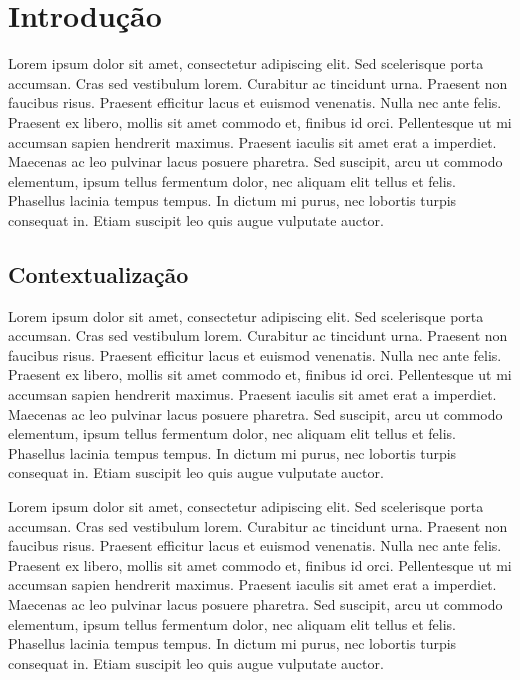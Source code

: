 \chapter{Introdução}
\label{1-introducao}

Lorem ipsum dolor sit amet, consectetur adipiscing elit. Sed scelerisque porta accumsan. Cras sed vestibulum lorem. Curabitur ac tincidunt urna. Praesent non faucibus risus. Praesent efficitur lacus et euismod venenatis. Nulla nec ante felis. Praesent ex libero, mollis sit amet commodo et, finibus id orci. Pellentesque ut mi accumsan sapien hendrerit maximus. Praesent iaculis sit amet erat a imperdiet. Maecenas ac leo pulvinar lacus posuere pharetra. Sed suscipit, arcu ut commodo elementum, ipsum tellus fermentum dolor, nec aliquam elit tellus et felis. Phasellus lacinia tempus tempus. In dictum mi purus, nec lobortis turpis consequat in. Etiam suscipit leo quis augue vulputate auctor.


\section{Contextualização}
\label{1-contextualizacao}
Lorem ipsum dolor sit amet, consectetur adipiscing elit. Sed scelerisque porta accumsan. Cras sed vestibulum lorem. Curabitur ac tincidunt urna. Praesent non faucibus risus. Praesent efficitur lacus et euismod venenatis. Nulla nec ante felis. Praesent ex libero, mollis sit amet commodo et, finibus id orci. Pellentesque ut mi accumsan sapien hendrerit maximus. Praesent iaculis sit amet erat a imperdiet. Maecenas ac leo pulvinar lacus posuere pharetra. Sed suscipit, arcu ut commodo elementum, ipsum tellus fermentum dolor, nec aliquam elit tellus et felis. Phasellus lacinia tempus tempus. In dictum mi purus, nec lobortis turpis consequat in. Etiam suscipit leo quis augue vulputate auctor.




Lorem ipsum dolor sit amet, consectetur adipiscing elit. Sed scelerisque porta accumsan. Cras sed vestibulum lorem. Curabitur ac tincidunt urna. Praesent non faucibus risus. Praesent efficitur lacus et euismod venenatis. Nulla nec ante felis. Praesent ex libero, mollis sit amet commodo et, finibus id orci. Pellentesque ut mi accumsan sapien hendrerit maximus. Praesent iaculis sit amet erat a imperdiet. Maecenas ac leo pulvinar lacus posuere pharetra. Sed suscipit, arcu ut commodo elementum, ipsum tellus fermentum dolor, nec aliquam elit tellus et felis. Phasellus lacinia tempus tempus. In dictum mi purus, nec lobortis turpis consequat in. Etiam suscipit leo quis augue vulputate auctor.

